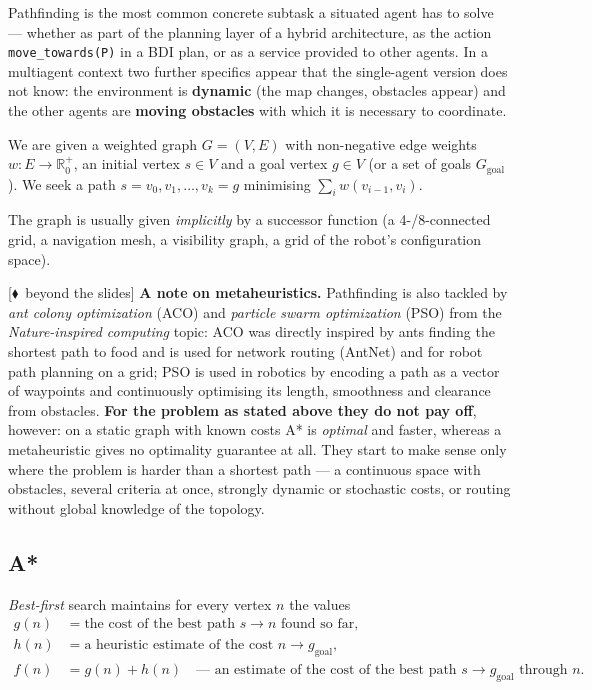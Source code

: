\documentclass[11pt,a4paper]{article}
\theoremstyle{definition}
\newcommand{\mimo}{\textcolor{markcol}{\textsf{\footnotesize[$\blacklozenge$~beyond the slides]}}}
\begin{document}
Pathfinding is the most common concrete subtask a situated agent has to solve --- whether as part of
the planning layer of a hybrid architecture, as the action \texttt{move\_towards(P)} in a BDI plan, or
as a service provided to other agents.
In a multiagent context two further specifics appear that the single-agent version does not know:
the environment is \textbf{dynamic} (the map changes, obstacles appear) and the other agents are
\textbf{moving obstacles} with which it is necessary to coordinate.

\begin{defbox}
We are given a weighted graph $G = (V,E)$ with non-negative edge weights $w : E \to \mathbb{R}_0^+$,
an initial vertex $s \in V$ and a goal vertex $g \in V$ (or a set of goals $G_{\mathrm{goal}}$).
We seek a path $s = v_0, v_1, \dots, v_k = g$ minimising $\sum_{i} w(v_{i-1},v_i)$.

The graph is usually given \emph{implicitly} by a successor function (a 4-/8-connected grid, a
navigation mesh, a visibility graph, a grid of the robot's configuration space).
\end{defbox}

\mimo{} \textbf{A note on metaheuristics.} Pathfinding is also tackled by \emph{ant colony
optimization} (ACO) and \emph{particle swarm optimization} (PSO) from the \emph{Nature-inspired
computing} topic: ACO was directly inspired by ants finding the shortest path to food and is used
for network routing (AntNet) and for robot path planning on a grid; PSO is used in robotics by
encoding a path as a vector of waypoints and continuously optimising its length, smoothness and
clearance from obstacles. \textbf{For the problem as stated above they do not pay off}, however:
on a static graph with known costs A* is \emph{optimal} and faster, whereas a metaheuristic gives
no optimality guarantee at all. They start to make sense only where the problem is harder than
a shortest path --- a continuous space with obstacles, several criteria at once, strongly dynamic
or stochastic costs, or routing without global knowledge of the topology.

\subsection{A*}

\emph{Best-first} search maintains for every vertex $n$ the values
\begin{align*}
g(n) &= \text{the cost of the best path } s \to n \text{ found so far}, \\
h(n) &= \text{a heuristic estimate of the cost } n \to g_{\mathrm{goal}}, \\
f(n) &= g(n) + h(n) \quad \text{--- an estimate of the cost of the best path } s \to g_{\mathrm{goal}}
  \text{ through } n .
\end{align*}
\end{document}
